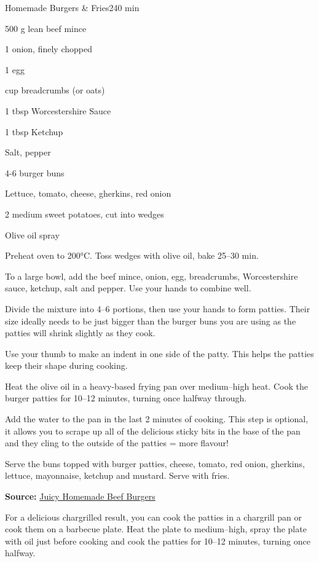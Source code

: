 
\begin{recipebox}{Homemade Burgers \& Fries}{2}{40 min}
\begin{ingredients}
  \item 500 g lean beef mince
  \item 1 onion, finely chopped
  \item 1 egg
  \item {} cup breadcrumbs (or oats)
  \item 1 tbsp Worcestershire Sauce
  \item 1 tbsp Ketchup
  \item Salt, pepper
  \item 4-6 burger buns
  \item Lettuce, tomato, cheese, gherkins, red onion
  \item 2 medium sweet potatoes, cut into wedges
  \item Olive oil spray
\end{ingredients}

\begin{method}
  \item Preheat oven to 200°C. Toss wedges with olive oil, bake 25–30 min.
  \item To a large bowl, add the beef mince, onion, egg, breadcrumbs, Worcestershire sauce, ketchup, salt and pepper. Use your hands to combine well.
  \item Divide the mixture into 4–6 portions, then use your hands to form patties. Their size ideally needs to be just bigger than the burger buns you are using as the patties will shrink slightly as they cook.
  \item Use your thumb to make an indent in one side of the patty. This helps the patties keep their shape during cooking.
  \item Heat the olive oil in a heavy-based frying pan over medium–high heat. Cook the burger patties for 10–12 minutes, turning once halfway through. 
  \item Add the water to the pan in the last 2 minutes of cooking. This step is optional, it allows you to scrape up all of the delicious sticky bits in the base of the pan and they cling to the outside of the patties = more flavour! 
  \item Serve the buns topped with burger patties, cheese, tomato, red onion, gherkins, lettuce, mayonnaise, ketchup and mustard. Serve with fries.
\end{method}
\textbf{Source:} \href{https://simplehomeedit.com/recipe/homemade-beef-burger/}{Juicy Homemade Beef Burgers}

\begin{notes}
For a delicious chargrilled result, you can cook the patties in a chargrill pan or cook them on a barbecue plate. Heat the plate to medium–high, spray the plate with oil just before cooking and cook the patties for 10–12 minutes, turning once halfway.
\end{notes}

\end{recipebox}
\newpage

